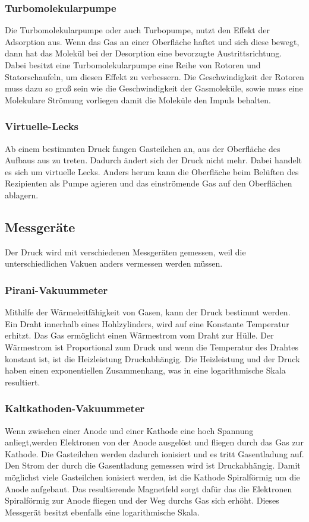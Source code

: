 \subsubsection{Turbomolekularpumpe}
Die Turbomolekularpumpe oder auch Turbopumpe, nutzt den Effekt der Adsorption aus. Wenn das Gas an einer Oberfläche haftet und sich diese bewegt, dann hat das Molekül bei der Desorption eine bevorzugte Austrittsrichtung. Dabei besitzt eine Turbomolekularpumpe eine Reihe von Rotoren und Statorschaufeln, um diesen Effekt zu verbessern. Die Geschwindigkeit der Rotoren muss dazu so groß sein wie die Geschwindigkeit der Gasmoleküle, sowie muss eine Molekulare Strömung vorliegen damit die Moleküle den Impuls behalten.
\subsubsection{Virtuelle-Lecks}
Ab einem bestimmten Druck fangen Gasteilchen an, aus der Oberfläche des Aufbaus aus zu treten. Dadurch ändert sich der Druck nicht mehr. Dabei handelt es sich um virtuelle Lecks. Anders herum kann die Oberfläche beim Belüften des Rezipienten als Pumpe agieren und das einströmende Gas auf den Oberflächen ablagern.
\subsection{Messgeräte}
Der Druck wird mit verschiedenen Messgeräten gemessen, weil die unterschiedlichen Vakuen anders vermessen werden müssen.
\subsubsection{Pirani-Vakuummeter}
Mithilfe der Wärmeleitfähigkeit von Gasen, kann der Druck bestimmt werden. Ein Draht innerhalb eines Hohlzylinders, wird auf eine Konstante Temperatur erhitzt. Das Gas ermöglicht einen Wärmestrom vom Draht zur Hülle. Der Wärmestrom ist Proportional zum Druck und wenn die Temperatur des Drahtes konstant ist, ist die Heizleistung Druckabhängig. Die Heizleistung und der Druck haben einen exponentiellen Zusammenhang, was in eine logarithmische Skala resultiert.
\subsubsection{Kaltkathoden-Vakuummeter}
Wenn zwischen einer Anode und einer Kathode eine hoch Spannung anliegt,werden Elektronen von der Anode ausgelöst und fliegen durch das Gas zur Kathode. Die Gasteilchen werden dadurch ionisiert und es tritt Gasentladung auf. Den Strom der durch die Gasentladung gemessen wird ist Druckabhängig. Damit möglichst viele Gasteilchen ionisiert werden, ist die Kathode Spiralförmig um die Anode aufgebaut. Das resultierende Magnetfeld sorgt dafür das die Elektronen Spiralförmig zur Anode fliegen und der Weg durchs Gas sich erhöht. Dieses Messgerät besitzt ebenfalls eine logarithmische Skala.

